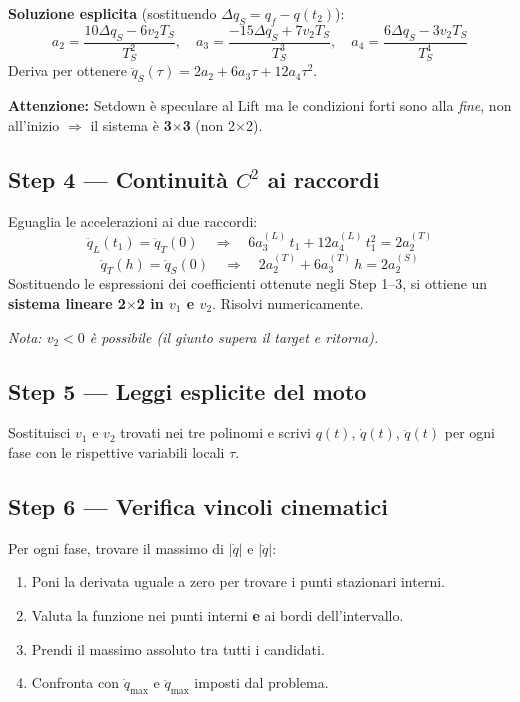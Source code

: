 \documentclass[10pt,a4paper]{article}
\begin{document}
\begin{cyanbox}
\textbf{Soluzione esplicita} (sostituendo $\Delta q_S = q_f - q(t_2)$):
\[
a_2 = \frac{10\Delta q_S - 6v_2 T_S}{T_S^2}, \quad
a_3 = \frac{-15\Delta q_S + 7v_2 T_S}{T_S^3}, \quad
a_4 = \frac{6\Delta q_S - 3v_2 T_S}{T_S^4}
\]
Deriva per ottenere $\ddot{q}_S(\tau) = 2a_2 + 6a_3\tau + 12a_4\tau^2$.
\end{cyanbox}

\begin{redbox}
\textbf{Attenzione:} Setdown \`e speculare al Lift ma le condizioni forti sono alla \emph{fine},
non all'inizio $\Rightarrow$ il sistema \`e \textbf{3$\times$3} (non 2$\times$2).
\end{redbox}

\subsection{Step 4 --- Continuit\`a $C^2$ ai raccordi}

Eguaglia le accelerazioni ai due raccordi:
\[
\ddot{q}_L(t_1) = \ddot{q}_T(0) \quad\Rightarrow\quad
6a_3^{(L)}\,t_1 + 12a_4^{(L)}\,t_1^2 = 2a_2^{(T)}
\]
\[
\ddot{q}_T(h) = \ddot{q}_S(0) \quad\Rightarrow\quad
2a_2^{(T)} + 6a_3^{(T)}\,h = 2a_2^{(S)}
\]
Sostituendo le espressioni dei coefficienti ottenute negli Step 1--3, si ottiene
un \textbf{sistema lineare 2$\times$2 in $v_1$ e $v_2$}. Risolvi numericamente.

\textit{Nota: $v_2 < 0$ \`e possibile (il giunto supera il target e ritorna).}

\subsection{Step 5 --- Leggi esplicite del moto}

Sostituisci $v_1$ e $v_2$ trovati nei tre polinomi e scrivi
$q(t)$, $\dot{q}(t)$, $\ddot{q}(t)$ per ogni fase con le rispettive variabili locali $\tau$.

\subsection{Step 6 --- Verifica vincoli cinematici}

Per ogni fase, trovare il massimo di $|\dot{q}|$ e $|\ddot{q}|$:
\begin{enumerate}
  \item Poni la derivata uguale a zero per trovare i punti stazionari interni.
  \item Valuta la funzione nei punti interni \textbf{e} ai bordi dell'intervallo.
  \item Prendi il massimo assoluto tra tutti i candidati.
  \item Confronta con $\dot{q}_{\max}$ e $\ddot{q}_{\max}$ imposti dal problema.
\end{enumerate}
\end{document}
